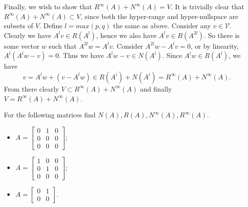 \documentclass{article}
\begin{document}
\begin{solution}
  Finally, we wish to show that $R^{\infty}(A) + N^{\infty}(A) = V$.
  It is trivially clear that $R^{\infty}(A) + N^{\infty}(A) \subset V$, since both the hyper-range and hyper-nullspace are subsets of $V$.
  Define $l = max(p, q)$ the same as above.
  Consider any $v \in \mathcal{V}$.
  Clearly we have $A^l v \in R(A^l)$, hence we also have $A^l v \in R(A^{2 l})$.
  So there is some vector $w$ such that $A^{2 l} w = A^l v$.
  Consider $A^{2 l} w - A^l v = 0$, or by linearity, $A^l (A^l w - v) = 0$.
  Thus we have $A^l w - v \in N(A^l)$.
  Since $A^l w \in R(A^l)$, we have
  \[v = A^l w + (v - A^l w) \in R(A^i) + N(A^i) = R^{\infty}(A) + N^{\infty}(A).\]
  From there clearly $V \subset R^{\infty}(A) + N^{\infty}(A)$ and finally $V = R^{\infty}(A) + N^{\infty}(A)$.
\end{solution}

\begin{problem}
  For the following matrices find $N(A), R(A), N^{\infty}(A), R^{\infty}(A)$.
  \begin{itemize}
    \item $A = \begin{bmatrix} 0 & 1 & 0\\ 0 & 0 & 0\\ 0 & 0 & 0 \end{bmatrix};$
    \item $A = \begin{bmatrix} 1 & 0 & 0\\ 0 & 1 & 0\\ 0 & 0 & 0 \end{bmatrix};$
    \item $A = \begin{bmatrix} 0 & 1\\ 0 & 0 \end{bmatrix}.$
  \end{itemize}
\end{problem}
\end{document}
